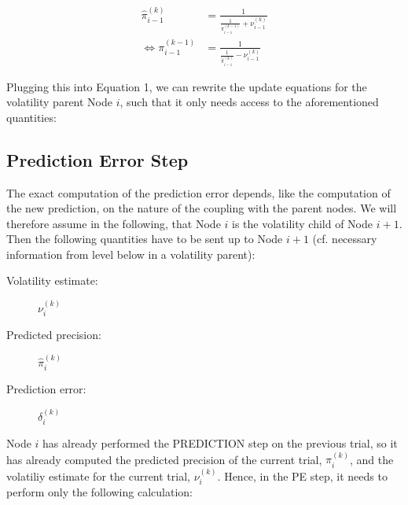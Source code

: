\begin{align*}
\hat{\pi}_{i-1}^{(k)} 			  &= \frac{1}{ \frac{1}{\pi_{i-1}^{(k-1)}}
								  + \nu_{i-1}^{(k)} }\\
\Leftrightarrow \pi_{i-1}^{(k-1)} &= \frac{1}{ \frac{1}{\hat{\pi}_{i-1}^{(k)}}
					  			  - \nu_{i-1}^{(k)} }
\end{align*}

Plugging this into Equation 1, we can rewrite the update equations for the volatility parent Node $i$, such that it only needs access to the aforementioned quantities:
\vspace{0.5cm}

\noindent
{}%
\vspace{0.5cm}


\subsection{Prediction Error Step}
The exact computation of the prediction error depends, like the computation of the new prediction, on the nature of the coupling with the parent nodes. We will therefore assume in the following, that Node $i$ is the volatility child of Node $i+1$. Then the following quantities have to be sent up to Node $i+1$ (cf. necessary information from level below in a volatility parent):

\begin{description}
\item[Volatility estimate:]  	$\nu_i^{(k)}$
\item[Predicted precision:] 	$\hat{\pi}_{i}^{(k)}$
\item[Prediction error:]		$\delta_{i}^{(k)}$
\end{description}

Node $i$ has already performed the \textsf{PREDICTION step} on the previous trial, so it has already computed the predicted precision of the current trial, $\hat{\pi}_{i}^{(k)}$, and the volatiliy estimate for the current trial, $\nu_i^{(k)}$. Hence, in the \textsf{PE step}, it needs to perform only the following calculation:
\vspace{0.5cm}

